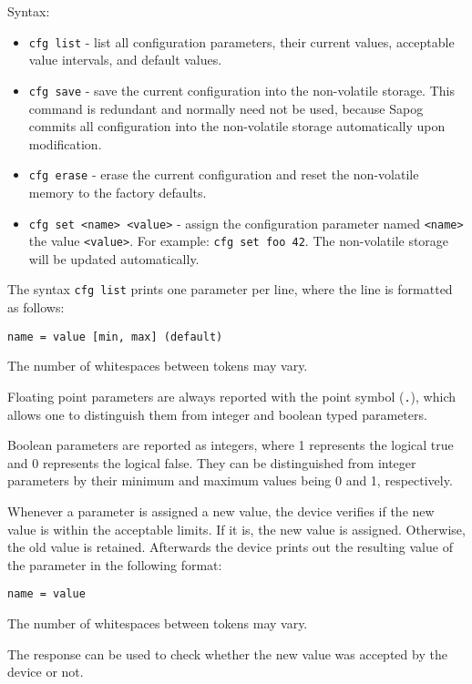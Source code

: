 \documentclass{zubaxdoc}
\begin{document}
Syntax:
\begin{itemize}
    \item \verb|cfg list| - list all configuration parameters, their current values,
          acceptable value intervals, and default values.

    \item \verb|cfg save| - save the current configuration into the non-volatile storage.
          This command is redundant and normally need not be used, because Sapog commits all configuration
          into the non-volatile storage automatically upon modification.

    \item \verb|cfg erase| - erase the current configuration and reset the non-volatile memory to
          the factory defaults.

    \item \verb|cfg set <name> <value>| - assign the configuration parameter named \verb|<name>| the value
          \verb|<value>|. For example: \verb|cfg set foo 42|.
          The non-volatile storage will be updated automatically.
\end{itemize}

The syntax \verb|cfg list| prints one parameter per line, where the line is formatted as follows:

\verb|name = value [min, max] (default)|

The number of whitespaces between tokens may vary.

Floating point parameters are always reported with the point symbol (\verb|.|),
which allows one to distinguish them from integer and boolean typed parameters.

Boolean parameters are reported as integers, where 1 represents the logical true and
0 represents the logical false.
They can be distinguished from integer parameters by their minimum and maximum values being 0 and 1,
respectively.

Whenever a parameter is assigned a new value, the device verifies if the new value is within the
acceptable limits.
If it is, the new value is assigned. Otherwise, the old value is retained.
Afterwards the device prints out the resulting value of the parameter in the following format:

\verb|name = value|

The number of whitespaces between tokens may vary.

The response can be used to check whether the new value was accepted by the device or not.
\end{document}
